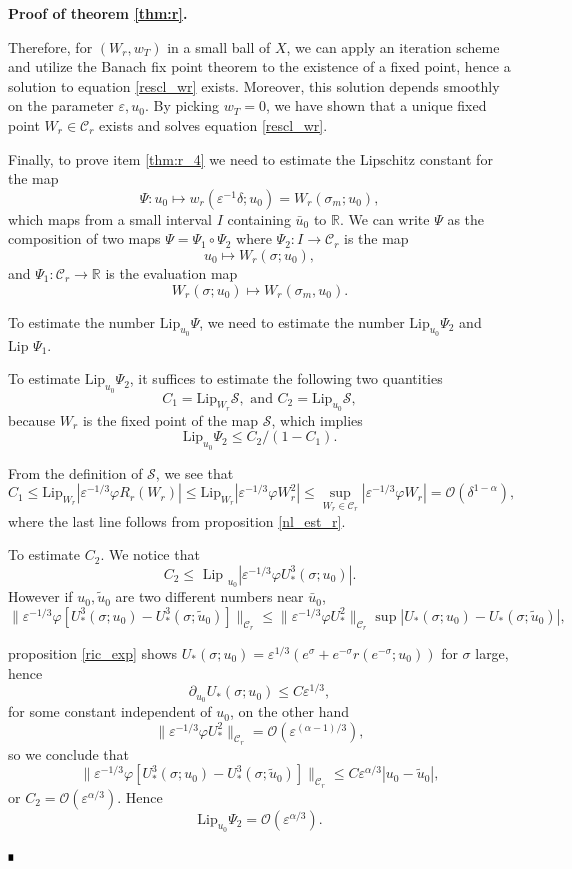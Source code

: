 \documentclass[letterpaper,11pt]{article}
\newcommand{\rmO}{\mathcal{O}}
\newcommand{\eps}{\varepsilon}
\numberwithin{equation}{section}
\theoremstyle{plain}
\newenvironment{Proof}[1][.]%
 {\begin{trivlist}\item[]\textbf{Proof#1 }}%
 {\hspace*{\fill}$\rule{0.3\baselineskip}{0.35\baselineskip}$\end{trivlist}}
\begin{document}
\begin{Proof}[ of theorem \ref{thm:r}.]
\begin{itemize}
\end{itemize}

Therefore, for $(W_r,w_T)$ in a small ball of $X$, we can apply an iteration scheme and utilize the Banach fix point theorem to the existence of a fixed point, hence a solution to equation \eqref{rescl_wr} exists. Moreover, this solution depends smoothly on the parameter $\eps, u_0$. By picking $w_T = 0$, we have shown that a unique fixed point $W_r \in \mathcal{C}_r$ exists and solves equation \eqref{rescl_wr}.


Finally, to prove item \ref{thm:r_4} we need to estimate the Lipschitz constant for the map 
\[
\Psi : u_0 \mapsto w_r(\eps^{-1}\delta; u_0)=W_r(\sigma_m;u_0),
\]
 which maps from a small interval $I$ containing $\bar{u}_0$ to $\mathbb{R}$. We can write $\Psi$ as the composition of two maps $\Psi = \Psi_1 \circ \Psi_2$ where $\Psi_2 : I \to \mathcal{C}_r$ is the map 
\[
 u_0 \mapsto W_r(\sigma; u_0),
\] 
and $\Psi_1 : \mathcal{C}_r \to \mathbb{R}$ is the evaluation map
\[
  W_r(\sigma; u_0) \mapsto W_r(\sigma_m, u_0).
\]
 
To estimate the number $\text{Lip}_{u_0} \Psi$, we need to estimate the number $\text{Lip}_{u_0} \Psi_2$ and $\text{Lip } \Psi_1$.

To estimate $\text{Lip}_{u_0} \Psi_2$, it suffices to estimate the following two quantities
\[
C_1 = \text{Lip}_{W_r} \mathcal{S}, \text{ and }C_2 = \text{Lip}_{u_0} \mathcal{S},
\]
because $W_r$ is the fixed point of the map $\mathcal{S}$, which implies
\[
\text{Lip}_{u_0} \Psi_2 \le  C_2/(1-C_1).
\]

From the definition of $\mathcal{S}$, we see that
\[
C_1 \le \text{Lip}_{W_r} |\eps^{-1/3}\varphi R_r(W_r)|\le \text{Lip}_{W_r} |\eps^{-1/3}\varphi W_r^2| \le\sup_{W_r \in \mathcal{C}_r} |\eps^{-1/3}\varphi W_r | = \rmO(\delta^{1-\alpha}),
\]
where the last line follows from proposition \ref{nl_est_r}.


To estimate $C_2$. We notice that 
\[
C_2 \le \text{ Lip }_{u_0} |\eps^{-1/3}\varphi U_*^3(\sigma;u_0) |.
\]
However if $u_0, \tilde{u}_0$ are two different numbers near $\bar{u}_0$,
\[
\|\eps^{-1/3}\varphi [U_*^3(\sigma;u_0)-U_*^3(\sigma;\tilde{u}_0)] \|_{\mathcal{C}_r} \le \|\eps^{-1/3}\varphi U_*^2 \|_{\mathcal{C}_r} \sup|U_*(\sigma;u_0)-U_*(\sigma;\tilde{u}_0)|,
\] 

proposition \ref{ric_exp} shows
$U_*(\sigma;u_0)= \eps^{1/3}(e^\sigma + e^{-\sigma} r(e^{-\sigma}; u_0))$ for $\sigma$ large, hence 
\[
\partial_{u_0} U_*(\sigma;u_0) \le C\eps^{1/3},
\]
for some constant independent of $u_0$, on the other hand
\[
\|\eps^{-1/3}\varphi U_*^2 \|_{\mathcal{C}_r}  = \rmO(\eps^{(\alpha-1)/3}),
\]
so we conclude that
\[
\|\eps^{-1/3}\varphi [U_*^3(\sigma;u_0)-U_*^3(\sigma;\tilde{u}_0)] \|_{\mathcal{C}_r} \le C\eps^{\alpha/3}|u_0 - \tilde{u}_0|,
\]
or $C_2 = \rmO(\eps^{\alpha/3})$. Hence 
\[
\text{Lip}_{u_0} \Psi_2 = \rmO(\eps^{\alpha/3}).
\]


\end{Proof}
\end{document}
